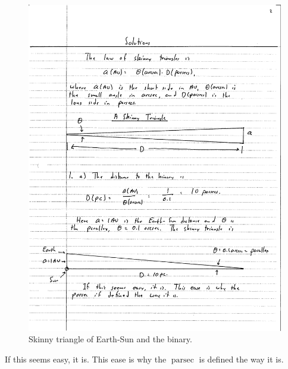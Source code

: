 \documentclass[11pt]{scrartcl}
\DeclareMathOperator{\parsec}{parsec}
\begin{document}
\begin{figure}[H]
\centering
\includegraphics[width=\textwidth]{figures/problem-set-2-earth-binary-1.pdf}
\caption{Skinny triangle of Earth-Sun and the binary.}
\end{figure}

If this seems easy, it is. This ease is why the $\parsec$ is defined the way it is.

\subsection{}
\end{document}
